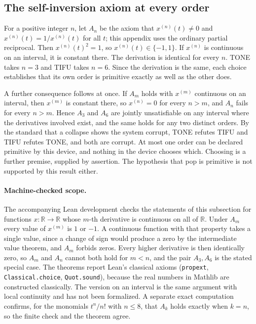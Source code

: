 \documentclass[11pt]{article}
\begin{document}
\subsection{The self-inversion axiom at every order}

For a positive integer $n$, let $A_n$ be the axiom that $x^{(n)}(t)\neq0$ and $x^{(n)}(t)=1/x^{(n)}(t)$ for all $t$; this appendix uses the ordinary partial reciprocal. Then $x^{(n)}(t)^2=1$, so $x^{(n)}(t)\in\{-1,1\}$. If $x^{(n)}$ is continuous on an interval, it is constant there. The derivation is identical for every $n$. TONE takes $n=3$ and TIFU takes $n=6$. Since the derivation is the same, each choice establishes that its own order is primitive exactly as well as the other does.

A further consequence follows at once. If $A_m$ holds with $x^{(m)}$ continuous on an interval, then $x^{(m)}$ is constant there, so $x^{(n)}=0$ for every $n>m$, and $A_n$ fails for every $n>m$. Hence $A_3$ and $A_6$ are jointly unsatisfiable on any interval where the derivatives involved exist, and the same holds for any two distinct orders. By the standard that a collapse shows the system corrupt, TONE refutes TIFU and TIFU refutes TONE, and both are corrupt. At most one order can be declared primitive by this device, and nothing in the device chooses which. Choosing is a further premise, supplied by assertion. The hypothesis that pop is primitive is not supported by this result either.

\paragraph{Machine-checked scope.} The accompanying Lean development checks the statements of this subsection for functions $x:\mathbb{R}\to\mathbb{R}$ whose $m$-th derivative is continuous on all of $\mathbb{R}$. Under $A_m$ every value of $x^{(m)}$ is $1$ or $-1$. A continuous function with that property takes a single value, since a change of sign would produce a zero by the intermediate value theorem, and $A_m$ forbids zeros. Every higher derivative is then identically zero, so $A_m$ and $A_n$ cannot both hold for $m<n$, and the pair $A_3,A_6$ is the stated special case. The theorems report Lean's classical axioms (\texttt{propext}, \texttt{Classical.choice}, \texttt{Quot.sound}), because the real numbers in Mathlib are constructed classically. The version on an interval is the same argument with local continuity and has not been formalized. A separate exact computation confirms, for the monomials $t^n/n!$ with $n\le8$, that $A_k$ holds exactly when $k=n$, so the finite check and the theorem agree.
\end{document}
